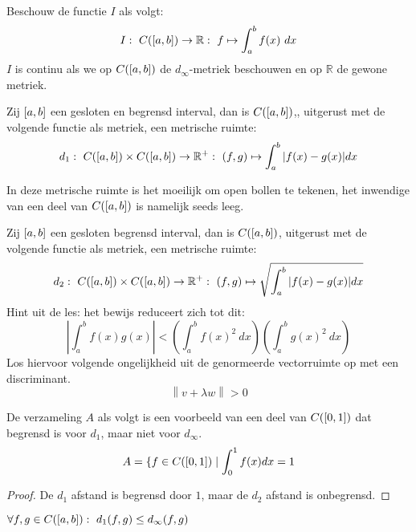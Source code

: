 \documentclass[main.tex]{subfiles}
\begin{document}
\begin{vb}
  Beschouw de functie $I$ als volgt:
  \[ I:\ C(\interval{a}{b}) \rightarrow \mathbb{R}:\ f \mapsto \int_{a}^{b}f(x)\ dx \]
  $I$ is continu als we op $C(\interval{a}{b})$ de $d_{\infty}$-metriek beschouwen en op $\mathbb{R}$ de gewone metriek.
\end{vb}

\begin{vb}
  Zij $\interval{a}{b}$ een gesloten en begrensd interval, dan is $C(\interval{a}{b})$,, uitgerust met de volgende functie als metriek, een metrische ruimte:
  \[ d_{1}:\ C(\interval{a}{b})\times C(\interval{a}{b}) \rightarrow \mathbb{R}^{+}:\ (f,g) \mapsto \int_{a}^{b}|f(x)-g(x)|dx \]
\end{vb}

\begin{opm}
  In deze metrische ruimte is het moeilijk om open bollen te tekenen, het inwendige van een deel van $C(\interval{a}{b})$ is namelijk seeds leeg.
\end{opm}

\begin{vb}
  Zij $\interval{a}{b}$ een gesloten begrensd interval, dan is $C(\interval{a}{b})$, uitgerust met de volgende functie als metriek, een metrische ruimte:
  \[ d_{2}:\ C(\interval{a}{b})\times C(\interval{a}{b}) \rightarrow \mathbb{R}^{+}:\ (f,g) \mapsto \sqrt{\int_{a}^{b}|f(x)-g(x)|dx} \]
  Hint uit de les: het bewijs reduceert zich tot dit:
  \[ \left|\int_{a}^{b}f(x)g(x)\right| < \left(\int_{a}^{b}f(x)^{2}\ dx \right) \left(\int_{a}^{b}g(x)^{2}\ dx \right) \]
  Los hiervoor volgende ongelijkheid uit de genormeerde vectorruimte op met een discriminant.
  \[ \left\| v+\lambda w \right\| > 0 \]
\end{vb}

\begin{vb}
  De verzameling $A$ als volgt is een voorbeeld van een deel van $C(\interval{0}{1})$ dat begrensd is voor $d_{1}$, maar niet voor $d_{\infty}$.
  \[ A = \{ f \in C(\interval{0}{1}) \mid \int_{0}^{1}f(x)dx = 1 \]

  \begin{proof}
    De $d_{1}$ afstand is begrensd door $1$, maar de $d_{2}$ afstand is onbegrensd.
  \end{proof}
\end{vb}

\begin{st}
  $\forall f,g \in C(\interval{a}{b}):\ d_{1}(f,g) \le d_{\infty}(f,g)$
\end{st}
\end{document}
